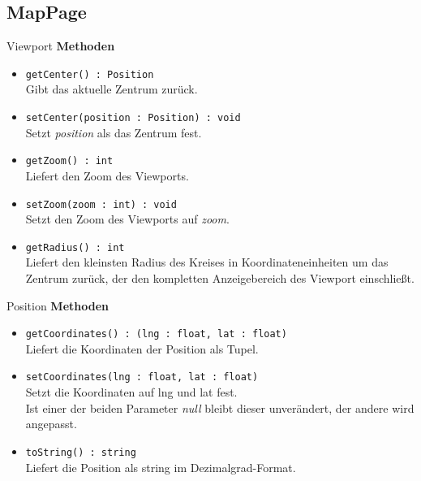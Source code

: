 \subsection{MapPage}

\begin{Class}{Viewport}
    \textbf{Methoden}
    \begin{itemize}
        \item \texttt{getCenter() : Position}
        \\ Gibt das aktuelle Zentrum zurück.
        \item \texttt{setCenter(position : Position) : void}
        \\ Setzt \emph{position} als das Zentrum fest.
        \item \texttt{getZoom() : int}
        \\ Liefert den Zoom des Viewports.
        \item \texttt{setZoom(zoom : int) : void}
        \\ Setzt den Zoom des Viewports auf \emph{zoom}.
        \item \texttt{getRadius() : int}
        \\ Liefert den kleinsten Radius des Kreises in Koordinateneinheiten um das Zentrum zurück,
         der den kompletten Anzeigebereich des Viewport einschließt.
    \end{itemize}
\end{Class}

\begin{Class}{Position}
    \textbf{Methoden}
    \begin{itemize}
        \item \texttt{getCoordinates() : (lng : float, lat : float)}
        \\ Liefert die Koordinaten der Position als Tupel.
        \item \texttt{setCoordinates(lng : float, lat : float)}
        \\ Setzt die Koordinaten auf lng und lat fest.
        \\ Ist einer der beiden Parameter \emph{null} bleibt dieser unverändert, der andere wird angepasst.
        \item \texttt{toString() : string}
        \\ Liefert die Position als string im Dezimalgrad-Format.
    \end{itemize}
\end{Class}

